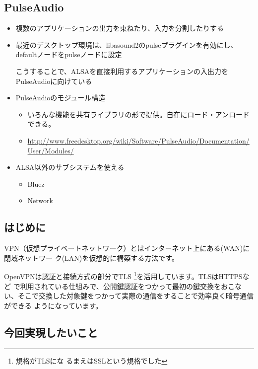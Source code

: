 \documentclass[mingoth,a4paper]{jsarticle}
\begin{document}
\subsection{PulseAudio}
\begin{itemize}
\item 複数のアプリケーションの出力を束ねたり、入力を分割したりする
\item 最近のデスクトップ環境は、libasound2のpulseプラグインを有効にし、defaultノードをpulseノードに設定

  こうすることで、ALSAを直接利用するアプリケーションの入出力をPulseAudioに向けている
\item PulseAudioのモジュール構造
  \begin{itemize}
  \item いろんな機能を共有ライブラリの形で提供。自在にロード・アンロードできる。
  \item \url{http://www.freedesktop.org/wiki/Software/PulseAudio/Documentation/User/Modules/}
  \end{itemize}
\item ALSA以外のサブシステムを使える
  \begin{itemize}
  \item Bluez
  \item Network
  \end{itemize}
\end{itemize}


\subsection{はじめに}

VPN（仮想プライベートネットワーク）とはインターネット上にある(WAN)に閉域ネットワー
ク(LAN)を仮想的に構築する方法です。

OpenVPNは認証と接続方式の部分でTLS\cite{rfc5246} \footnote{規格がTLSにな
るまえはSSLという規格でした}を活用しています。TLSはHTTPSなど
で利用されている仕組みで、公開鍵認証をつかって最初の鍵交換をおこな
い、そこで交換した対象鍵をつかって実際の通信をすることで効率良く暗号通信ができる
ようになっています。

\subsection{今回実現したいこと}
\end{document}
